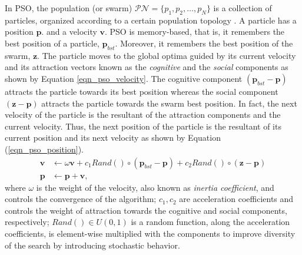 In PSO, the population (or swarm) $\mathcal{PN}=\{p_1,p_2,…,p_N\}$ is a collection of particles, organized according to a certain population topology \cite{Liu2016TopologyOptimization}. A particle has a position $\textbf{p}$. and a velocity $\textbf{v}$. PSO is memory-based, that is, it remembers the best position of a particle, $\textbf{p}_{bst}$. Moreover, it remembers the best position of the swarm, $\textbf{z}$. The particle moves to the global optima guided by its current velocity and its attraction vectors known as the \textit{cognitive} and the \textit{social} components as shown by Equation \ref{eqn_pso_velocity}. The cognitive component $(\textbf{p}_{bst}-\textbf{p})$ attracts the particle towards its best position whereas the social component $(\textbf{z}-\textbf{p})$ attracts the particle towards the swarm best position. In fact, the next velocity of the particle is the resultant of the attraction components and the current velocity. Thus, the next position of the particle is the resultant of its current position and its next velocity as shown by Equation (\ref{eqn_pso_position}).
\begin{align}
\label{eqn_pso_velocity}
\textbf{v} &\leftarrow  \omega\textbf{v} + c_1Rand()\circ(\textbf{p}_{bst}-\textbf{p}) + c_2Rand()\circ(\textbf{z}-\textbf{p})\\
\label{eqn_pso_position}
\textbf{p} &\leftarrow \textbf{p} + \textbf{v},
\end{align}
where $\omega$ is the weight of the velocity, also known as \textit{inertia coefficient}, and controls the convergence of the algorithm; $c_1, c_2$ are acceleration coefficients and controls the weight of attraction towards the cognitive and social components, respectively; $Rand()\in U(0,1)$ is a random function, along the acceleration coefficients, is element-wise multiplied with the components to improve diversity of the search by introducing stochastic behavior.

